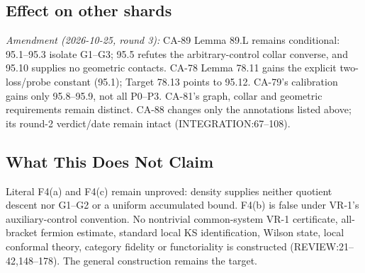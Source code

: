 \subsection{Effect on other shards}
\emph{Amendment (2026-10-25, round 3):} CA-89 Lemma 89.L remains conditional: 95.1--95.3 isolate G1--G3;
95.5 refutes the arbitrary-control collar converse, and 95.10 supplies no geometric contacts. CA-78 Lemma 78.11
gains the explicit two-loss/probe constant (95.1); Target 78.13 points to 95.12. CA-79's calibration gains only
95.8--95.9, not all P0--P3. CA-81's graph, collar and geometric requirements remain distinct.
CA-88 changes only the annotations listed above; its round-2 verdict/date remain intact (INTEGRATION:67--108).

\subsection{What This Does Not Claim}
Literal F4(a) and F4(c) remain unproved: density supplies neither quotient descent nor G1--G2 or a uniform
accumulated bound. F4(b) is false under VR-1's auxiliary-control convention. No nontrivial common-system VR-1
certificate, all-bracket fermion estimate, standard local KS identification, Wilson state, local conformal theory,
category fidelity or functoriality is constructed (REVIEW:21--42,148--178). The general construction remains the target.

